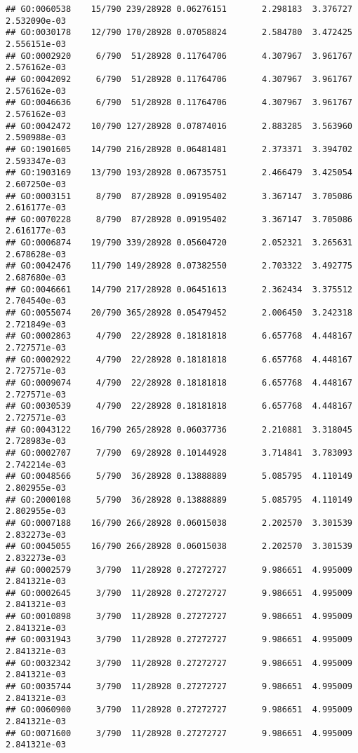 \documentclass[
]{article}
\begin{document}
\begin{verbatim}
## GO:0060538    15/790 239/28928 0.06276151       2.298183  3.376727 2.532090e-03
## GO:0030178    12/790 170/28928 0.07058824       2.584780  3.472425 2.556151e-03
## GO:0002920     6/790  51/28928 0.11764706       4.307967  3.961767 2.576162e-03
## GO:0042092     6/790  51/28928 0.11764706       4.307967  3.961767 2.576162e-03
## GO:0046636     6/790  51/28928 0.11764706       4.307967  3.961767 2.576162e-03
## GO:0042472    10/790 127/28928 0.07874016       2.883285  3.563960 2.590988e-03
## GO:1901605    14/790 216/28928 0.06481481       2.373371  3.394702 2.593347e-03
## GO:1903169    13/790 193/28928 0.06735751       2.466479  3.425054 2.607250e-03
## GO:0003151     8/790  87/28928 0.09195402       3.367147  3.705086 2.616177e-03
## GO:0070228     8/790  87/28928 0.09195402       3.367147  3.705086 2.616177e-03
## GO:0006874    19/790 339/28928 0.05604720       2.052321  3.265631 2.678628e-03
## GO:0042476    11/790 149/28928 0.07382550       2.703322  3.492775 2.687680e-03
## GO:0046661    14/790 217/28928 0.06451613       2.362434  3.375512 2.704540e-03
## GO:0055074    20/790 365/28928 0.05479452       2.006450  3.242318 2.721849e-03
## GO:0002863     4/790  22/28928 0.18181818       6.657768  4.448167 2.727571e-03
## GO:0002922     4/790  22/28928 0.18181818       6.657768  4.448167 2.727571e-03
## GO:0009074     4/790  22/28928 0.18181818       6.657768  4.448167 2.727571e-03
## GO:0030539     4/790  22/28928 0.18181818       6.657768  4.448167 2.727571e-03
## GO:0043122    16/790 265/28928 0.06037736       2.210881  3.318045 2.728983e-03
## GO:0002707     7/790  69/28928 0.10144928       3.714841  3.783093 2.742214e-03
## GO:0048566     5/790  36/28928 0.13888889       5.085795  4.110149 2.802955e-03
## GO:2000108     5/790  36/28928 0.13888889       5.085795  4.110149 2.802955e-03
## GO:0007188    16/790 266/28928 0.06015038       2.202570  3.301539 2.832273e-03
## GO:0045055    16/790 266/28928 0.06015038       2.202570  3.301539 2.832273e-03
## GO:0002579     3/790  11/28928 0.27272727       9.986651  4.995009 2.841321e-03
## GO:0002645     3/790  11/28928 0.27272727       9.986651  4.995009 2.841321e-03
## GO:0010898     3/790  11/28928 0.27272727       9.986651  4.995009 2.841321e-03
## GO:0031943     3/790  11/28928 0.27272727       9.986651  4.995009 2.841321e-03
## GO:0032342     3/790  11/28928 0.27272727       9.986651  4.995009 2.841321e-03
## GO:0035744     3/790  11/28928 0.27272727       9.986651  4.995009 2.841321e-03
## GO:0060900     3/790  11/28928 0.27272727       9.986651  4.995009 2.841321e-03
## GO:0071600     3/790  11/28928 0.27272727       9.986651  4.995009 2.841321e-03

\end{verbatim}
\end{document}

